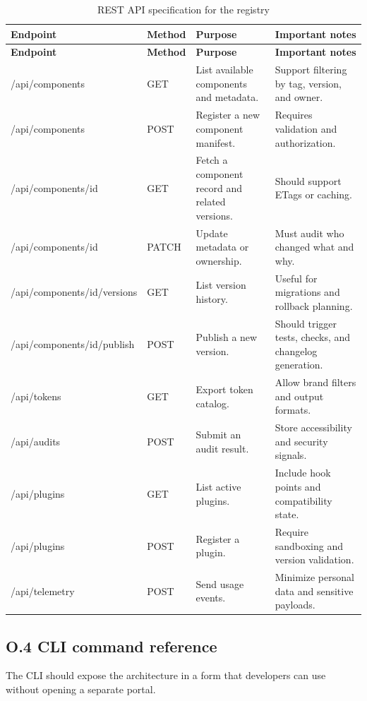 \begin{longtable}{@{}p{}p{}p{}p{}@{}}
\caption{REST API specification for the registry}\label{tab:registry-api}\\
\toprule
\textbf{Endpoint} & \textbf{Method} & \textbf{Purpose} & \textbf{Important notes} \\
\midrule
\endfirsthead
\toprule
\textbf{Endpoint} & \textbf{Method} & \textbf{Purpose} & \textbf{Important notes} \\
\midrule
\endhead
\bottomrule
\endfoot
/api/components & GET & List available components and metadata. & Support filtering by tag, version, and owner. \\
/api/components & POST & Register a new component manifest. & Requires validation and authorization. \\
/api/components/{id} & GET & Fetch a component record and related versions. & Should support ETags or caching. \\
/api/components/{id} & PATCH & Update metadata or ownership. & Must audit who changed what and why. \\
/api/components/{id}/versions & GET & List version history. & Useful for migrations and rollback planning. \\
/api/components/{id}/publish & POST & Publish a new version. & Should trigger tests, checks, and changelog generation. \\
/api/tokens & GET & Export token catalog. & Allow brand filters and output formats. \\
/api/audits & POST & Submit an audit result. & Store accessibility and security signals. \\
/api/plugins & GET & List active plugins. & Include hook points and compatibility state. \\
/api/plugins & POST & Register a plugin. & Require sandboxing and version validation. \\
/api/telemetry & POST & Send usage events. & Minimize personal data and sensitive payloads. \\
\end{longtable}

\subsection*{O.4 CLI command reference}
The CLI should expose the architecture in a form that developers can use without opening a separate portal.

